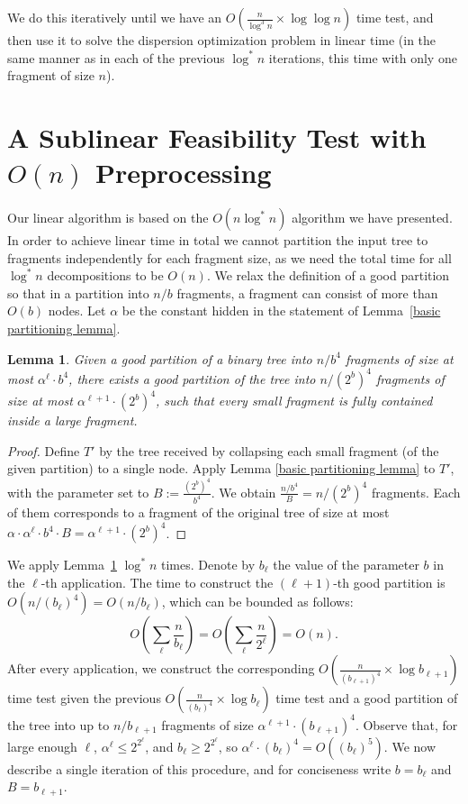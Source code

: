 \documentclass[11pt,a4paper]{article}
\newtheorem{lemma}{Lemma}
\theoremstyle{definition}
\theoremstyle{remark}
\begin{document}
We do this iteratively until we have an $O(\frac{n}{\log ^3n} \times \log \log n)$ time test, and then use it to
solve the dispersion optimization problem in linear time (in the same manner as in each of the previous
$\log ^*n$ iterations, this time with only one fragment of size $n$).


\section{A Sublinear Feasibility Test with \boldmath
\boldmath$O(n)$ Preprocessing}\label{sectionLinear}
Our linear algorithm is based on the $O(n \log ^*n)$ algorithm we have presented. In order to achieve linear time
in total we cannot partition the input tree to fragments independently for each fragment size, as we need
the total time for all $\log^{*}n$ decompositions to be $O(n)$. We relax the definition of a good partition
so that in a partition into $n/b$ fragments, a fragment can consist of more than $O(b)$ nodes.
Let $\alpha$ be the constant hidden in the statement of Lemma~\ref{basic partitioning lemma}.

\begin{lemma}\label{good partition refinement lemma}
Given a good partition of a binary tree into $n/b^{4}$ fragments of size at most $\alpha^{\ell}\cdot b^{4}$, there
exists a good partition of the tree into $n/(2^b)^{4}$ fragments of size at most $\alpha^{\ell+1}\cdot (2^{b})^{4}$,
such that every small fragment is fully contained inside a large fragment.
\end{lemma}
\begin{proof}
Define $T'$ by the tree received by collapsing each small fragment (of the given partition) to a single node. Apply 
Lemma \ref{basic partitioning lemma} to $T'$, with the parameter set to $B:= \frac{(2^{b})^{4}}{b^{4}}$. We obtain
$\frac{n/b^4}{B}=n/(2^{b})^{4}$ fragments. Each of them corresponds to a fragment of the original tree of size at
most $\alpha\cdot \alpha^{\ell}\cdot b^{4}\cdot B = \alpha^{\ell+1}\cdot (2^{b})^{4}$.
\end{proof}

We apply Lemma~\ref{good partition refinement lemma} $\log^{*}n$ times. Denote by $b_{\ell}$ the value of
the parameter $b$ in the $\ell$-th application.
The time to construct the $(\ell+1)$-th good partition is $O(n/(b_{\ell})^{4})=O(n/b_{\ell})$,
which can be bounded as follows: $$ O(\sum_{\ell} \frac{n}{b_{\ell}}) = O(\sum_{\ell} \frac{n}{2^{\ell}}) = O(n).$$
After every application, we construct the corresponding $O(\frac{n}{(b_{\ell+1})^{4}}\times \log b_{\ell+1})$ time
test given the previous $O(\frac{n}{(b_{\ell})^{4}}\times \log b_{\ell})$ time test and a good partition of the tree
into up to $n/b_{\ell+1}$ fragments of size $\alpha^{\ell+1} \cdot (b_{\ell+1})^{4}$.
Observe that, for large enough $\ell$, $\alpha^{\ell}\leq 2^{2^{\ell}}$, and $b_{\ell}\geq 2^{2^{\ell}}$,
so $\alpha^{\ell}\cdot (b_{\ell})^{4} = O((b_{\ell})^{5})$. %
We now describe a single iteration of this procedure, and for conciseness write $b=b_{\ell}$ and $B=b_{\ell+1}$.
\end{document}
